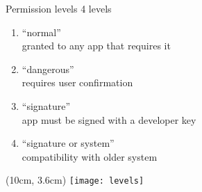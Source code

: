 \begin{frame}[fragile]{Permission levels}
  4 levels
  \begin{center}
  \begin{enumerate}
    \item ``normal''\\
    granted to any app that requires it

    \vspace*{0.4cm}

    \item ``dangerous''\\
    requires user confirmation

    \vspace*{0.4cm}

    \item ``signature''\\
    app must be signed with a developer key

    \vspace*{0.4cm}

    \item ``signature or system''\\
    compatibility with older system
  \end{enumerate}

  \begin{textblock*}{1cm}(10cm, 3.6cm)
    \texttt{[image: levels]}
  \end{textblock*}

  \end{center}
\end{frame}